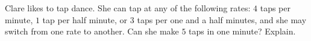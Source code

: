 Clare likes to tap dance. She can tap at any of the following rates: $4$ taps per minute, $1$ tap per half minute, or $3$ taps per one and a half minutes, and she may switch from one rate to another. Can she make $5$ taps in one minute? Explain.
